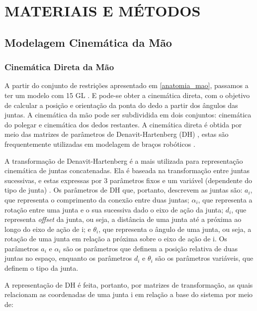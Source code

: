 
\chapter{MATERIAIS E MÉTODOS}\label{cap3}

\section{Modelagem Cinemática da Mão}

\subsection{Cinemática Direta da Mão}
\label{cinematica_direta_mao}
A partir do conjunto de restrições apresentado em \ref{anatomia_mao}, passamos a ter um modelo com 15 GL \cite{lin2000modeling}. E pode-se obter a cinemática direta, com o objetivo de calcular a posição e orientação da ponta do dedo a partir dos ângulos das juntas. A cinemática da mão pode ser subdividida em dois conjuntos: cinemática do polegar e cinemática dos dedos restantes. A cinemática direta é obtida por meio das matrizes de parâmetros de Denavit-Hartenberg (DH) \cite{hartenberg1964kinematic}, estas são frequentemente utilizadas em modelagem de braços robóticos \cite{cobos2008efficient}.

A transformação de Denavit-Hartenberg é a mais utilizada para representação cinemática de juntas concatenadas. Ela é baseada na transformação entre juntas sucessivas, e estas expressas por 3 parâmetros fixos e um variável (dependente do tipo de junta) \cite{newman2000calibration}. Os parâmetros de DH que, portanto, descrevem as juntas são: $a_i$, que representa o comprimento da conexão entre duas juntas; $\alpha_i$, que representa a rotação entre uma junta e o sua sucessiva dado o eixo de ação da junta; $d_i$, que representa \textit{offset} da junta, ou seja, a distância de uma junta até a próxima ao longo do eixo de ação de i; e $\theta_i$, que representa o ângulo de uma junta, ou seja, a rotação de uma junta em relação a próxima sobre o eixo de ação de i. Os parâmetros $a_i$ e $\alpha_i$ são os parâmetros que definem a posição relativa de duas juntas no espaço, enquanto os parâmetros $d_i$ e $\theta_i$ são os parâmetros variáveis, que definem o tipo da junta\cite{corke2007simple}.

A representação de DH é feita, portanto, por matrizes de transformação, as quais relacionam as coordenadas de uma junta i em relação a base do sistema por meio de:

